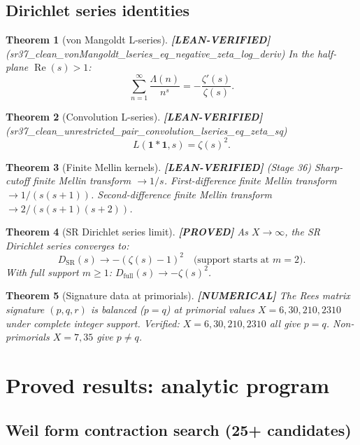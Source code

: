 \documentclass[11pt]{article}
\newtheorem{theorem}{Theorem}[section]
\theoremstyle{remark}
\newcommand{\LEANVERIFIED}{\textbf{\color{green!60!black}[LEAN-VERIFIED]}}
\newcommand{\PROVED}{\textbf{\color{blue}[PROVED]}}
\newcommand{\NUMERICAL}{\textbf{\color{orange}[NUMERICAL]}}
\begin{document}
\subsection{Dirichlet series identities}

\begin{theorem}[von Mangoldt L-series] \LEANVERIFIED{} \textnormal{(sr37\_clean\_vonMangoldt\_lseries\_eq\_negative\_zeta\_log\_deriv)}
In the half-plane $\operatorname{Re}(s) > 1$:
\[
\sum_{n=1}^\infty \frac{\Lambda(n)}{n^s} = -\frac{\zeta'(s)}{\zeta(s)}.
\]
\end{theorem}

\begin{theorem}[Convolution L-series] \LEANVERIFIED{} \textnormal{(sr37\_clean\_unrestricted\_pair\_convolution\_lseries\_eq\_zeta\_sq)}
\[
L(\mathbf{1} * \mathbf{1}, s) = \zeta(s)^2.
\]
\end{theorem}

\begin{theorem}[Finite Mellin kernels] \LEANVERIFIED{} \textnormal{(Stage 36)}
Sharp-cutoff finite Mellin transform $\to 1/s$.
First-difference finite Mellin transform $\to 1/(s(s+1))$.
Second-difference finite Mellin transform $\to 2/(s(s+1)(s+2))$.
\end{theorem}

\begin{theorem}[SR Dirichlet series limit] \PROVED{}
As $X \to \infty$, the SR Dirichlet series converges to:
\[
D_{\mathrm{SR}}(s) \to -(\zeta(s) - 1)^2 \quad \text{(support starts at } m=2\text{)}.
\]
With full support $m \geq 1$: $D_{\mathrm{full}}(s) \to -\zeta(s)^2$.
\end{theorem}

\begin{theorem}[Signature data at primorials] \NUMERICAL{}
The Rees matrix signature $(p, q, r)$ is balanced ($p = q$) at primorial values
$X = 6, 30, 210, 2310$ under complete integer support.
Verified: $X = 6, 30, 210, 2310$ all give $p = q$.
Non-primorials $X = 7, 35$ give $p \neq q$.
\end{theorem}

\section{Proved results: analytic program}

\subsection{Weil form contraction search (25+ candidates)}
\end{document}
